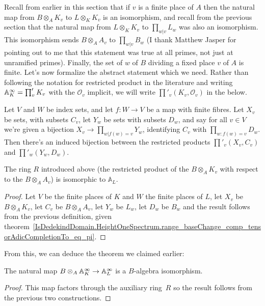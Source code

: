 Recall from earlier in this section that if $v$ is a finite place of $A$ then the natural map from
$B\otimes_A K_v$ to $L\otimes_KK_v$ is an isomorphism, and recall from the previous section
that the natural map from $L\otimes_KK_v$ to $\prod_{w|v}L_w$ was also an isomorphism.
This isomorphism sends $B\otimes_A A_v$ to $\prod_{w|v}B_w$ (I thank Matthew Jasper for
pointing out to me that this statement was true at all primes, not just at unramified primes).
Finally, the set of $w$ of $B$ dividing a fixed place $v$ of $A$ is finite.
Let's now formalize the abstract statement which we need. Rather than following the
notation for restricted product in the literature and writing $\mathbb{A}_K^\infty=\prod'_vK_v$
with the $\mathcal{O}_v$ implicit, we will write $\prod'_v(K_v,\mathcal{O}_v)$ in the below.

\begin{definition}
  \label{RestrictedProduct.relabelIso}
  Let $V$ and $W$ be index sets, and let $f:W\to V$ be a map with finite fibres.
  Let $X_v$ be sets, with subsets $C_v$, let $Y_w$ be sets with subsets $D_w$,
  and say for all $v\in V$ we're given a bijection $X_v\to\prod_{w|f(w)=v}Y_w$,
  identifying $C_v$ with $\prod_{w:f(w)=v}D_w$. Then there's an induced bijection between
  the restricted products $\prod'_v(X_v,C_v)$ and $\prod'_w(Y_w,D_w)$.
\end{definition}

\begin{corollary}
  \label{IsDedekindDomain.FiniteAdeleRing.IntegraltensorProductAlgEquiv_aux2}
  The ring $R$ introduced above (the restricted
  product of the $B\otimes_A K_v$ with respect to the $B\otimes_A A_v$)
  is isomorphic to $\mathbb{A}_L$.
\end{corollary}
\begin{proof} Let $V$ be the finite places of $K$ and $W$ the finite places of $L$,
  let $X_v$ be $B\otimes_A K_v$, let $C_v$ be $B\otimes_A A_v$, let $Y_w$ be $L_w$,
  let $D_w$ be $B_w$ and the result follows from the previous definition, given
  theorem~\ref{IsDedekindDomain.HeightOneSpectrum.range_baseChange_comp_tensorAdicCompletionTo_eq_pi}.
\end{proof}
From this, we can deduce the theorem we claimed earlier:

\begin{theorem}
  \label{IsDedekindDomain.FiniteAdeleRing.baseChangeIntegralAlgEquiv}
  The natural map $B\otimes_A\mathbb{A}_K^\infty\to\mathbb{A}_L^\infty$ is a $B$-algebra
  isomorphism.
\end{theorem}
\begin{proof}
  This map factors through the auxiliary ring~$R$ so the result follows
  from the previous two constructions.
\end{proof}

